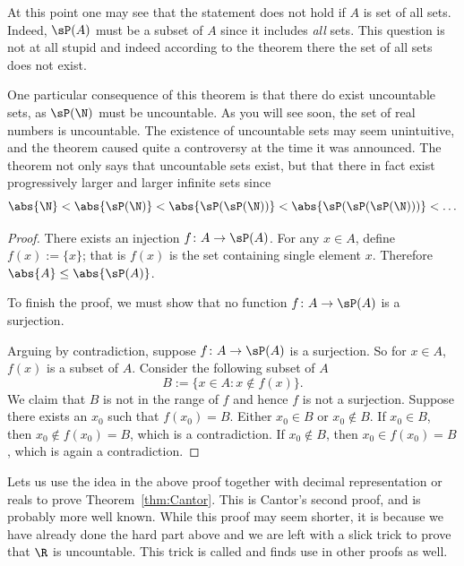 \documentclass[12pt]{book}
\begin{document}
At this point one may see that the statement does not hold if $A$ is set of all sets.
Indeed, $\sP(A)$ must be a subset of $A$ since it includes \emph{all} sets.
This question is not at all stupid and indeed according to the theorem there the set of all sets does not exist.

One particular consequence of this 
theorem is that there do exist uncountable sets,
as $\sP(\N)$ must be uncountable.
As you will see soon, the set of real numbers is uncountable.
The existence of uncountable sets may seem unintuitive, and the theorem
caused quite a controversy at the time
it was announced.
The theorem not only says that uncountable sets exist,
but that there in fact exist progressively larger
and larger infinite sets since 
$$\abs{\N}<\abs{\sP(\N)}<\abs{\sP(\sP(\N))}<\abs{\sP(\sP(\sP(\N)))}<\ldots$$


\begin{proof}
There exists an injection $f \colon A \to \sP(A)$.
For any $x \in A$, define $f(x) := \{ x \}$;
that is $f(x)$ is the set containing single element $x$. 
Therefore $\abs{A} \leq \abs{\sP(A)}$.

To finish the proof, we must show that
no function $f \colon A \to \sP(A)$ is a surjection.

Arguing by contradiction, suppose
$f \colon A \to \sP(A)$ is a surjection.  
So for $x \in A$, $f(x)$ is a subset of $A$.  
Consider the following subset of $A$
\begin{equation*}
B := \{ x \in A : x \notin f(x) \} .
\end{equation*}
We claim that $B$ is not in the range of $f$ and hence $f$ is not a
surjection.  
Suppose there exists an $x_0$ such that $f(x_0) = B$.
Either $x_0 \in B$ or $x_0 \notin B$.  
If $x_0 \in B$, then $x_0 \notin f(x_0) = B$, which is a contradiction.  
If $x_0 \notin B$, then $x_0 \in f(x_0) = B$, which is again a contradiction.
\end{proof}

Lets us use the idea in the above proof together with decimal representation or reals to prove Theorem~\ref{thm:Cantor}.
This is Cantor's second proof, and is probably more well known.
While this proof may seem shorter, it is because we have already done the hard part above and we are left with a slick trick to prove that $\R$ is uncountable.  
This trick is called \emph{} and finds use in other proofs as well.
\end{document}
